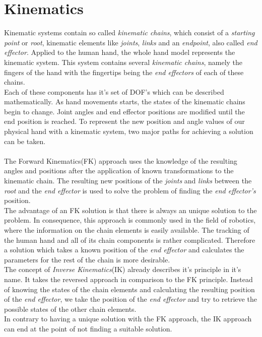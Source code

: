 \section{Kinematics}
\label{sec:kinematics}
Kinematic systems contain so called \textit{kinematic chains}, which consist of a \textit{starting point} or \textit{root}, kinematic elements like \textit{joints}, \textit{links} and an \textit{endpoint}, also called \textit{end effector}. Applied to the human hand, the whole hand model represents the kinematic system. This system contains several \textit{kinematic chains}, namely the fingers of the hand with the fingertips being the \textit{end effectors} of each of these chains.
\\Each of these components has it's set of DOF's which can be described mathematically. As hand movements starts, the states of the kinematic chains begin to change. Joint angles and end effector positions are modified until the end position is reached. To represent the new position and angle values of our physical hand with a kinematic system, two major paths for achieving a solution can be taken.\\\\
The Forward Kinematics(FK) approach uses the knowledge of the resulting angles and positions after the application of known transformations to the kinematic chain. The resulting new positions of the \textit{joints} and \textit{links} between the \textit{root} and the \textit{end effector} is used to solve the problem of finding the \textit{end effector's} position.\\
The advantage of an FK solution is that there is always an unique solution to the problem. In consequence, this approach is commonly used in the field of robotics, where the information on the chain elements is easily available.
The tracking of the human hand and all of its chain components is rather complicated. Therefore a solution which takes a known position of the \textit{end effector} and calculates the parameters for the rest of the chain is more desirable.\\
The concept of \textit{Inverse Kinematics}(IK) already describes it's principle in it's name. It takes the reversed approach in comparison to the FK principle. Instead of knowing the states of the chain elements and calculating the resulting position of the \textit{end effector}, we take the position of the \textit{end effector} and try to retrieve the possible states of the other chain elements. \\
In contrary to having a unique solution with the FK approach, the IK approach can end at the point of not finding a suitable solution.
